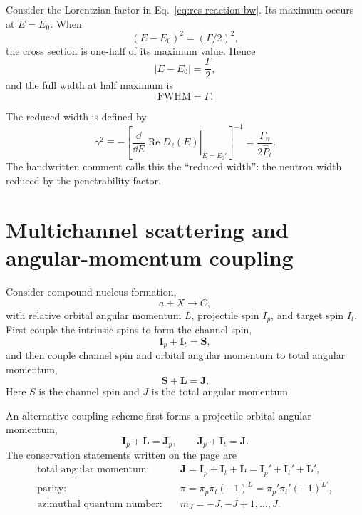 Consider the Lorentzian factor in Eq.~\eqref{eq:res-reaction-bw}.  Its maximum occurs at $E=E_0$.  When
\[
  (E-E_0)^2=(\Gamma/2)^2,
\]
the cross section is one-half of its maximum value.  Hence
\[
  |E-E_0|=\frac{\Gamma}{2},
\]
and the full width at half maximum is
\begin{equation}
  \boxed{\mathrm{FWHM}=\Gamma.}
  \label{eq:res-fwhm}
\end{equation}

The reduced width is defined by
\begin{equation}
  \boxed{
  \gamma^2
  \equiv
  -\left[
  \left.
    \frac{\dd}{\dd E}\operatorname{Re}D_\ell(E)
  \right|_{E=E_0'}
  \right]^{-1}
  =\frac{\Gamma_n}{2\widehat P_\ell}.}
  \label{eq:res-reduced-width}
\end{equation}
The handwritten comment calls this the ``reduced width'': the neutron width reduced by the penetrability factor.

\section{Multichannel scattering and angular-momentum coupling}
Consider compound-nucleus formation,
\[
  a+X\longrightarrow C,
\]
with relative orbital angular momentum $L$, projectile spin $I_p$, and target spin $I_t$.  First couple the intrinsic spins to form the channel spin,
\begin{equation}
  \bm I_p+\bm I_t=\bm S,
  \label{eq:res-channel-spin}
\end{equation}
and then couple channel spin and orbital angular momentum to total angular momentum,
\begin{equation}
  \bm S+\bm L=\bm J.
  \label{eq:res-total-J-coupling}
\end{equation}
Here $S$ is the channel spin and $J$ is the total angular momentum.

An alternative coupling scheme first forms a projectile orbital angular momentum,
\[
  \bm I_p+\bm L=\bm J_p,
  \qquad
  \bm J_p+\bm I_t=\bm J.
\]
The conservation statements written on the page are
\begin{align*}
  \text{total angular momentum:}\quad
  &\bm J=\bm I_p+\bm I_t+\bm L
   =\bm I_p'+\bm I_t'+\bm L',\\
  \text{parity:}\quad
  &\pi=\pi_p\pi_t(-1)^L
  =\pi_p'\pi_t'(-1)^{L'},\\
  \text{azimuthal quantum number:}\quad
  &m_J=-J,-J+1,\ldots,J.
\end{align*}

